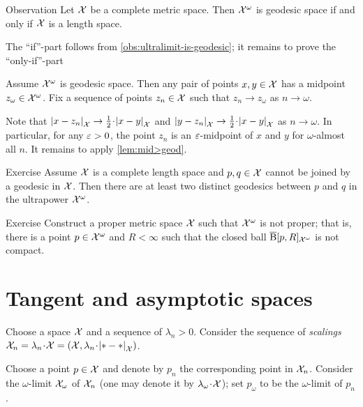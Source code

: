 \begin{thm}{Observation}\label{obs:ultrapower-is-geodesic}
Let $\mathcal{X}$ be a complete metric space. 
Then $\mathcal{X}^\omega$ is geodesic space if and only if $\mathcal{X}$ is a length space.
\end{thm}

The ``if''-part follows from \ref{obs:ultralimit-is-geodesic}; it remains to prove the ``only-if''-part

Assume $\mathcal{X}^\omega$ is geodesic space.
Then any pair of points $x,y\in \mathcal{X}$ has a midpoint $z_\omega\in\mathcal{X}^\omega$.
Fix a sequence of points $z_n\in  \mathcal{X}$ such that $z_n\to z_\omega$ as $n\to \omega$.

Note that 
$\dist{x}{z_n}{\spc{X}}\to \tfrac12\cdot \dist{x}{y}{\spc{X}}$
and 
$\dist{y}{z_n}{\spc{X}}\to \tfrac12\cdot \dist{x}{y}{\spc{X}}$
as 
$n\to\omega$.
In particular, for any $\varepsilon>0$, the point $z_n$ is an $\varepsilon$-midpoint of $x$ and $y$ for $\omega$-almost all $n$.
It remains to apply \ref{lem:mid>geod}.
\qeds

\begin{thm}{Exercise}\label{ex:two-geodesics-in-ultrapower}
Assume $\mathcal{X}$ is a complete length space 
and $p,q\in\mathcal{X}$ cannot be joined by a geodesic in $\mathcal{X}$.  
Then there are at least two distinct geodesics between $p$ and $q$ 
in the ultrapower $\mathcal{X}^\omega$.
\end{thm}

\begin{thm}{Exercise}\label{ex:notproper-limit}
 Construct a proper metric space $\mathcal{X}$ such that $\mathcal{X}^\omega$ is not proper; that is, there is a point $p\in \mathcal{X}^\omega$ and $R<\infty$ such that the closed ball $\overline{\mathrm{B}}{}[p,R]_{\mathcal{X}^\omega}$ is not compact.
\end{thm}

\section{Tangent and asymptotic spaces}

Choose a space $\mathcal{X}$ and a sequence of $\lambda_n>0$.
Consider the sequence of \emph{scalings} $\spc{X}_n=\lambda_n\cdot\spc{X}=(\spc{X},\lambda_n\cdot\dist{*}{*}{\spc{X}})$.

Choose a point $p\in \mathcal{X}$ and denote by $p_n$ the corresponding point in $\mathcal{X}_n$.
Consider the $\omega$-limit $\mathcal{X}_\omega$ of $\mathcal{X}_n$ (one may denote it by $\lambda_\omega\cdot \spc{X}$);
set $p_\omega$ to be the $\omega$-limit of $p_n$.


